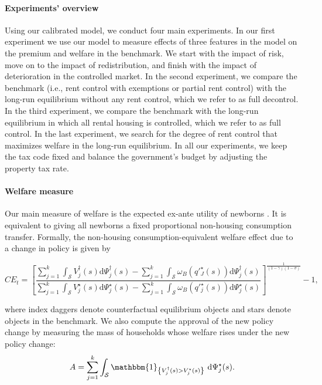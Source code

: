 \documentclass[parskip=full]{article}
\newcommand{\indicator}[1]{\mathbbm{1}_{\left\{ {#1} \right\} }}
\begin{document}
\paragraph{Experiments' overview} Using our calibrated model, we conduct four main experiments. In our first experiment we use our model to measure effects of three features in the model on the premium and welfare in the benchmark. We start with the impact of risk, move on to the impact of redistribution, and finish with the impact of deterioration in the controlled market. In the second experiment, we compare the benchmark (i.e., rent control with exemptions or partial rent control) with the long-run equilibrium without any rent control, which we refer to as full decontrol. In the third experiment, we compare the benchmark with the long-run equilibrium in which all rental housing is controlled, which we refer to as full control. In the last experiment, we search for the degree of rent control that maximizes welfare in the long-run equilibrium. In all our experiments, we keep the tax code fixed and balance the government's budget by adjusting the property tax rate. 

\paragraph{Welfare measure} Our main measure of welfare is the expected ex-ante utility of newborns \citep{ralws-1971,conesa-et-al,gkkoc}. It is equivalent to giving all newborns a fixed proportional non-housing consumption transfer. Formally, the non-housing consumption-equivalent welfare effect due to a change in policy is given by

\begin{equation}
  CE_{t} = \left[\frac{\sum_{j=1}^{k}\int_{\mathcal{S}}V^{\dagger}_{j}(s)\mathrm{d}\Psi^{\dagger}_{j}(s)-\sum_{j=1}^{k}\int_{\mathcal{S}}\omega_{B}(q'^{\star}_{J}(s))\mathrm{d}\Psi^{\dagger}_{j}(s)}{\sum_{j=1}^{k}\int_{\mathcal{S}}V^{\star}_{j}(s)\mathrm{d}\Psi^{\star}_{j}(s)-\sum_{j=1}^{k}\int_{\mathcal{S}}\omega_{B}(q'^{\star}_{j}(s))\mathrm{d}\Psi^{\star}_{j}(s)}\right]^{\frac{1}{(1-\gamma)(1-\sigma)}}-1,
\end{equation}

\noindent where index daggers denote counterfactual equilibrium objects and stars denote objects in the benchmark. We also compute the approval of the new policy change by measuring the mass of households whose welfare rises under the new policy change:
\begin{equation}
A = \sum_{j=1}^{k}\int_{\mathcal{S}} \indicator{V^{\dagger}_{j}(s)>V^{\star}_{j}(s)}\ \mathrm{d}\Psi^{\star}_{j}(s).
\end{equation}
\end{document}
